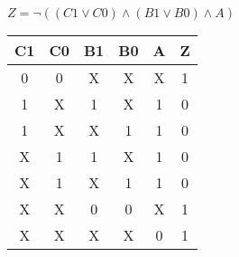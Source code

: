 
\begin{center}
    {\(Z = \lnot ((C1 \lor C0) \land (B1 \lor B0) \land A) \)}
    \begin{table}[h] %
        \begin{center}
            \begin{tabular}{|c|c|c|c|c||c|} \hline
            C1 & C0 & B1 & B0 & A & Z \\ \hline\hline
            0  & 0  & X  & X  & X & 1 \\ \hline
            1  & X  & 1  & X  & 1 & 0 \\ \hline
            1  & X  & X  & 1  & 1 & 0 \\ \hline
            X  & 1  & 1  & X  & 1 & 0 \\ \hline
            X  & 1  & X  & 1  & 1 & 0 \\ \hline
            X  & X  & 0  & 0  & X & 1 \\ \hline
            X  & X  & X  & X  & 0 & 1 \\ \hline
            \end{tabular}
        \end{center}
    \end{table}
\end{center}
